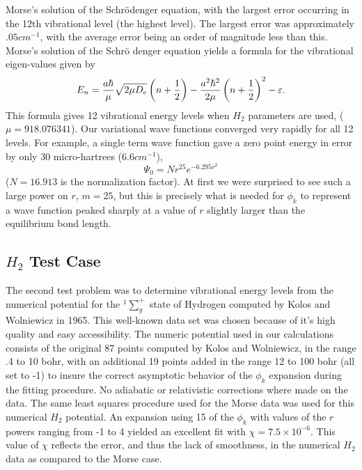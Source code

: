 \documentclass[12pt,thmsa]{article}
\begin{document}
Morse's solution of the Schr\"{o}denger equation\cite{Morse29}, with the
largest error occurring in the 12th vibrational level (the highest level).
The largest error was approximately $.05cm^{-1}$, with the average error
being an order of magnitude less than this. Morse's solution of the Schr\"{o}%
denger equation yields a formula for the vibrational eigen-values given by 
\begin{equation}
E_n=\frac{a\hbar }\mu \sqrt{2\mu D_e}\left( n+\frac 12\right) -\frac{%
a^2\hbar ^2}{2\mu }\left( n+\frac 12\right) ^2-\varepsilon .
\end{equation}
This formula gives 12 vibrational energy levels when $H_2$ parameters are
used, ($\mu =918.076341$). Our variational wave functions converged very
rapidly for all 12 levels. For example, a single term wave function gave a
zero point energy in error by only 30 micro-hartrees (6.6$cm^{-1}$), 
\begin{equation}
\Psi _0=Nr^{25}e^{-6.295r^2}
\end{equation}
($N=16.913$ is the normalization factor). At first we were surprised to see
such a large power on $r$, $m=25$, but this is precisely what is needed for $%
\phi _k$ to represent a wave function peaked sharply at a value of $r$
slightly larger than the equilibrium bond length.

\subsection{$H_2$ Test Case}

The second test problem was to determine vibrational energy levels from the
numerical potential for the $^1\sum_g^{+}$ state of Hydrogen computed by
Kolos and Wolniewicz in 1965\cite{Kolos65}. This well-known data set was
chosen because of it's high quality and easy accessibility. The numeric
potential used in our calculations consists of the original 87 points
computed by Kolos and Wolniewicz, in the range .4 to 10 bohr, with an
additional 19 points added in the range 12 to 100 bohr (all set to -1) to
insure the correct asymptotic behavior of the $\phi _k$ expansion during the
fitting procedure. No adiabatic or relativistic corrections where made on
the data. The same least squares procedure used for the Morse data was used
for this numerical $H_2$ potential. An expansion using 15 of the $\phi _k$
with values of the $r$ powers ranging from -1 to 4 yielded an excellent fit
with $\chi =7.5\times 10^{-6}.$ This value of $\chi $ reflects the error,
and thus the lack of smoothness, in the numerical $H_2$ data as compared to
the Morse case.
\end{document}
